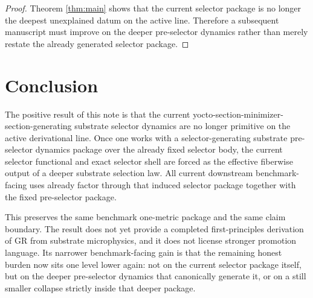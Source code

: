 \documentclass[11pt]{article}
\begin{document}
\begin{proof}
Theorem \ref{thm:main} shows that the current selector package is no longer the deepest unexplained datum on the active line. Therefore a subsequent manuscript must improve on the deeper pre-selector dynamics rather than merely restate the already generated selector package.
\end{proof}

\section{Conclusion}

The positive result of this note is that the current yocto-section-minimizer-section-generating substrate selector dynamics are no longer primitive on the active derivational line. Once one works with a selector-generating substrate pre-selector dynamics package over the already fixed selector body, the current selector functional and exact selector shell are forced as the effective fiberwise output of a deeper substrate selection law. All current downstream benchmark-facing uses already factor through that induced selector package together with the fixed pre-selector package.

This preserves the same benchmark one-metric package and the same claim boundary. The result does not yet provide a completed first-principles derivation of GR from substrate microphysics, and it does not license stronger promotion language. Its narrower benchmark-facing gain is that the remaining honest burden now sits one level lower again: not on the current selector package itself, but on the deeper pre-selector dynamics that canonically generate it, or on a still smaller collapse strictly inside that deeper package.
\end{document}
